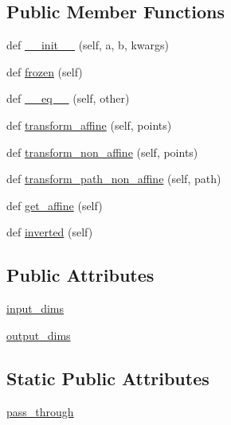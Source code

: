 \subsection*{Public Member Functions}
\begin{DoxyCompactItemize}
\item 
def \hyperlink{classmatplotlib_1_1transforms_1_1CompositeGenericTransform_a26d7d367a6588232c9576ad0d7e3f96a}{\+\_\+\+\_\+init\+\_\+\+\_\+} (self, a, b, kwargs)
\item 
def \hyperlink{classmatplotlib_1_1transforms_1_1CompositeGenericTransform_a42e8c9bf008883e09da6e522d0c8fd3c}{frozen} (self)
\item 
def \hyperlink{classmatplotlib_1_1transforms_1_1CompositeGenericTransform_a9f7e74868afe5fdb0cae8b0478a85aa4}{\+\_\+\+\_\+eq\+\_\+\+\_\+} (self, other)
\item 
def \hyperlink{classmatplotlib_1_1transforms_1_1CompositeGenericTransform_ab314a50391c012728f95ab15d70afae9}{transform\+\_\+affine} (self, points)
\item 
def \hyperlink{classmatplotlib_1_1transforms_1_1CompositeGenericTransform_ac690fcc11056e272b39b3d5c37aea237}{transform\+\_\+non\+\_\+affine} (self, points)
\item 
def \hyperlink{classmatplotlib_1_1transforms_1_1CompositeGenericTransform_a486ee0726dfaf9a605e9836406992776}{transform\+\_\+path\+\_\+non\+\_\+affine} (self, path)
\item 
def \hyperlink{classmatplotlib_1_1transforms_1_1CompositeGenericTransform_a375fe7db4dbd4c1bb1f97ab68ad716e6}{get\+\_\+affine} (self)
\item 
def \hyperlink{classmatplotlib_1_1transforms_1_1CompositeGenericTransform_ad2bb448c43a582ed019d6b329b1a55ac}{inverted} (self)
\end{DoxyCompactItemize}
\subsection*{Public Attributes}
\begin{DoxyCompactItemize}
\item 
\hyperlink{classmatplotlib_1_1transforms_1_1CompositeGenericTransform_a69d035425e6e94f59767756404d394ce}{input\+\_\+dims}
\item 
\hyperlink{classmatplotlib_1_1transforms_1_1CompositeGenericTransform_ad86f2821814104b6b1f303feebc63ce9}{output\+\_\+dims}
\end{DoxyCompactItemize}
\subsection*{Static Public Attributes}
\begin{DoxyCompactItemize}
\item 
\hyperlink{classmatplotlib_1_1transforms_1_1CompositeGenericTransform_a3e2e4c2967613b7ebb7d84898fc77174}{pass\+\_\+through}
\end{DoxyCompactItemize}
